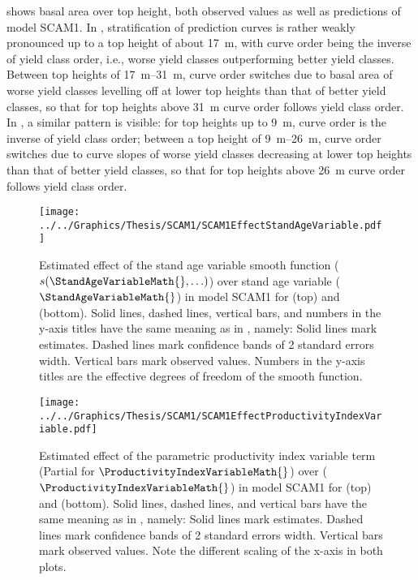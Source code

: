  shows basal area over top height, both observed values as well as predictions of model SCAM1.  In \Beech{}, stratification of prediction curves is rather weakly pronounced up to a top height of about \SI{17}{\meter}, with curve order being the inverse of yield class order, i.e., worse yield classes outperforming better yield classes.  Between top heights of \SIrange{17}{31}{\meter}, curve order switches due to basal area of worse yield classes levelling off at lower top heights than that of better yield classes, so that for top heights above \SI{31}{\meter} curve order follows yield class order.  In \Spruce{}, a similar pattern is visible:  for top heights up to \SI{9}{\meter}, curve order is the inverse of yield class order;  between a top height of \SIrange{9}{26}{\meter}, curve order switches due to curve slopes of worse yield classes decreasing at lower top heights than that of better yield classes, so that for top heights above \SI{26}{\meter} curve order follows yield class order.

\begin{figure}[h]
  \centering
  \texttt{[image: ../../Graphics/Thesis/SCAM1/SCAM1EffectStandAgeVariable.pdf]}
  \caption{Estimated effect of the stand age variable smooth function (\(s(\StandAgeVariableMath{}, \ldots)\)) over stand age variable (\(\StandAgeVariableMath{}\)) in model SCAM1 for \Beech{} (top) and \Spruce{} (bottom).   Solid lines, dashed lines, vertical bars, and numbers in the y-axis titles have the same meaning as in , namely:  Solid lines mark estimates.  Dashed lines mark confidence bands of 2 standard errors width.  Vertical bars mark observed values.  Numbers in the y-axis titles are the effective degrees of freedom of the smooth function.}
  \label{fig:SCAM1EffectStandAgeVariable}
\end{figure}

\begin{figure}[h]
  \centering
  \texttt{[image: ../../Graphics/Thesis/SCAM1/SCAM1EffectProductivityIndexVariable.pdf]}
  \caption{Estimated effect of the parametric productivity index variable term (Partial for \(\ProductivityIndexVariableMath{}\)) over \ProductivityIndexVariableText{} (\(\ProductivityIndexVariableMath{}\)) in model SCAM1 for \Beech{} (top) and \Spruce{} (bottom).   Solid lines, dashed lines, and vertical bars have the same meaning as in , namely:  Solid lines mark estimates.  Dashed lines mark confidence bands of 2 standard errors width.  Vertical bars mark observed values.  Note the different scaling of the x-axis in both plots.}
  \label{fig:SCAM1EffectProductivityIndexVariable}
\end{figure}

